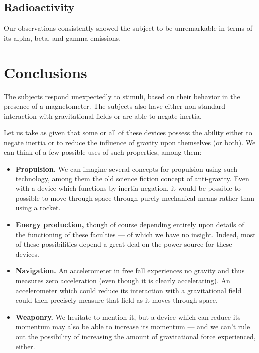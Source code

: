 \documentclass[10pt]{article}
\theoremstyle{definition}
\begin{document}
\subsection{Radioactivity}
Our observations consistently showed the subject to be unremarkable in terms of its alpha, beta, and gamma emissions.

\section{Conclusions}\label{conclusions}
The subjects respond unexpectedly to stimuli, based on their behavior in the presence of a magnetometer. The subjects also have either non-standard interaction with gravitational fields or are able to negate inertia.

Let us take as given that some or all of these devices possess the ability either to negate inertia or to reduce the influence of gravity upon themselves (or both).
We can think of a few possible uses of such properties, among them:
\begin{itemize}
\item \textbf{Propulsion.} We can imagine several concepts for propulsion using such technology, among them the old science fiction concept of anti-gravity. Even with a device which functions by inertia negation, it would be possible to possible to move through space through purely mechanical means rather than using a rocket.
\item \textbf{Energy production,} though of course depending entirely upon details of the functioning of these faculties --- of which we have no insight. Indeed, most of these possibilities depend a great deal on the power source for these devices.
\item \textbf{Navigation.} An accelerometer in free fall experiences no gravity and thus measures zero acceleration (even though it is clearly accelerating). An accelerometer which could reduce its interaction with a gravitational field could then precisely measure that field as it moves through space.
\item \textbf{Weaponry.} We hesitate to mention it, but a device which can reduce its momentum may also be able to increase its momentum --- and we can't rule out the possibility of increasing the amount of gravitational force experienced, either.
\end{itemize}

 
\end{document}
